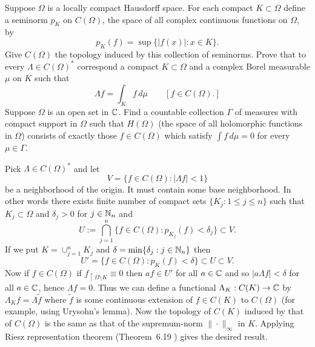 \begin{enumerate}
\begin{excopy}
\begin{itemize}
Suppose \(\Omega\) is a locally compact Hausdorff space.
For each compact \(K\subset \Omega\) define a seminorm \(p_K\) on
\(C(\Omega)\), the space of all complex continuous functions on \(\Omega\), by
\begin{equation*}
p_K(f) = \sup \{|f(x)|: x\in K\}.
\end{equation*}
Give \(C(\Omega)\) the topology induced by this collection of seminorms.
Prove that to every \(\Lambda \in C(\Omega)^*\) correspond a compact
 \(K\subset \Omega\) and a complex Borel  measurable \(\mu\) on $K$ such that
\begin{equation*}
\Lambda f = \int_K f\,d\mu \qquad [f \in C(\Omega).]
\end{equation*}
Suppose \(\Omega\) is an open set in \(\mathbb{C}\).
Find a countable collection \(\Gamma\) of measures with compact support in
\(\Omega\) such that \(H(\Omega)\) (the space of all holomorphic functions
in \(\Omega\)) consists of exactly those \(f\in C(\Omega)\) which satisfy
\(\int f\,d\mu = 0\) for every \(\mu\in\Gamma\).
\end{itemize}
\end{excopy}

\begin{itemize}
Pick \(\Lambda \in C(\Omega)^*\) and let 
\begin{equation*}
V = \{f \in C(\Omega): |\Lambda f| < 1\}
\end{equation*}
be a neighborhood of the origin. 
It must contain some base neighborhood. In other words
there exists finite number of compact sets \(\{K_j: 1 \leq j \leq n\}\)
such that \(K_j \subset \Omega\) and \(\delta_j > 0\) for \(j \in \mathbb{N}_n\)
and
\begin{equation*}
U := \bigcap_{j=1}^n \{f \in C(\Omega): p_{K_j}(f) < \delta_j\} \subset V.
\end{equation*}
If we put \(K = \cup _{j=1}^n K_j\) and \(\delta = \min\{\delta_j: j\in \mathbb{N}_n\}\)
then 
\begin{equation*}
U' =  \{f \in C(\Omega): p_K(f) < \delta\} \subset U \subset V.
\end{equation*}
Now if \(f \in C(\Omega)\) if \(f_{\restriction \Omega \setminus K} \equiv 0\)
then \(af \in U'\) for all \(a\in \mathbb{C}\) and so 
\(|a\Lambda f| < \delta\)  for all \(a\in \mathbb{C}\), hence \(\Lambda f = 0\).
Thus we can define a functional \(\Lambda_K : C(K) \to \mathbb{C}\)
by \(\Lambda_K f = \Lambda \tilde{f}\)
where \(\tilde{f}\) is some continuous extension of \(f\in C(K)\)
to \(C(\Omega)\) (for example, using Urysohn's lemma).
Now the topology of \(C(K)\) induced by that of \(C(\Omega)\)
is the same as that of the supremum-norm \(\|\cdot\|_\infty\) in $K$.
Applying Riesz representation theorem 
(Theorem~6.19 \cite{RudinRCA87}) gives the desired result.


\end{itemize}
\end{enumerate}
